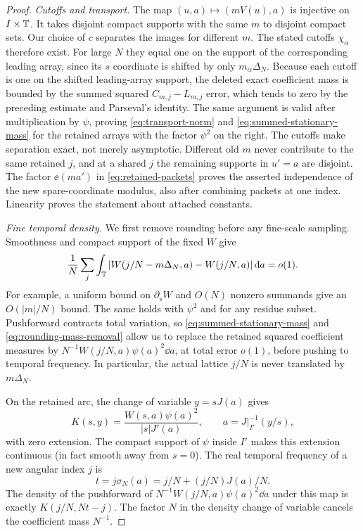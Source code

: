 \begin{proof}
\emph{Cutoffs and transport.}
The map $(u,a)\mapsto(mV(u),a)$ is injective on $I\times\mathbb T$.
It takes disjoint compact supports with the same $m$ to disjoint
compact sets. Our choice of $c$ separates the images for different
$m$. The stated cutoffs $\chi_\alpha$ therefore exist. For large $N$
they equal one on the support of the corresponding leading array,
since its $s$ coordinate is shifted by only $m_\alpha\Delta_N$.
Because each cutoff is one on the shifted leading-array support, the
deleted exact coefficient mass is bounded by the summed squared
$C_{m,j}-L_{m,j}$ error, which tends to zero by the preceding estimate
and Parseval's identity. The same argument is valid after
multiplication by $\psi$, proving \eqref{eq:transport-norm} and
\eqref{eq:summed-stationary-mass} for the retained arrays with the
factor $\psi^2$ on the right. The cutoffs make separation exact, not
merely asymptotic. Different old $m$ never contribute to the same
retained $j$, and at a shared $j$ the remaining supports in $u'=a$
are disjoint. The factor $\ee(ma')$ in
\eqref{eq:retained-packets} proves the asserted independence of the
new spare-coordinate modulus, also after combining packets at one
index. Linearity proves the statement about attached constants.

\emph{Fine temporal density.}
We first remove rounding before any fine-scale sampling. Smoothness and
compact support of the fixed $W$ give
\begin{equation}\label{eq:rounding-mass-removal}
 \frac1N\sum_j\int_\mathbb T
 |W(j/N-m\Delta_N,a)-W(j/N,a)|\,\mathrm d a=o(1).
\end{equation}
For example, a uniform bound on $\partial_s W$ and $O(N)$ nonzero
summands give an $O(|m|/N)$ bound. The same holds with $\psi^2$ and
for any residue subset. Pushforward contracts total variation, so
\eqref{eq:summed-stationary-mass} and
\eqref{eq:rounding-mass-removal} allow us to replace the retained
squared coefficient measures by
$N^{-1}W(j/N,a)\psi(a)^2\dd a$, at total error $o(1)$, before
pushing to temporal frequency. In particular, the actual lattice
$j/N$ is never translated by $m\Delta_N$.

On the retained arc, the change of variable $y=sJ(a)$ gives
\begin{equation}\label{eq:K-jacobian}
 K(s,y)=\frac{W(s,a)\psi(a)^2}{|s|J'(a)},
 \qquad a=J|_{I'}^{-1}(y/s),
\end{equation}
with zero extension. The compact support of $\psi$ inside $I'$ makes
this extension continuous (in fact smooth away from $s=0$).
The real temporal frequency of a new angular index $j$ is
\begin{equation}\label{eq:output-frequency}
 t=j\sigma_N(a)=j/N+(j/N)J(a)/N.
\end{equation}
The density of the pushforward of
$N^{-1}W(j/N,a)\psi(a)^2\dd a$ under this map is exactly
$K(j/N,Nt-j)$. The factor $N$ in the density change of variable
cancels the coefficient mass $N^{-1}$.


\end{proof}
